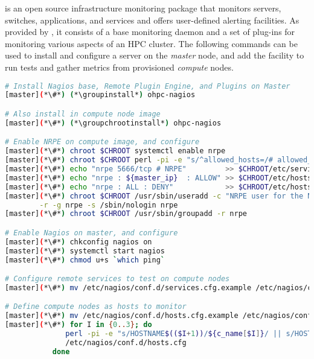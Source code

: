 \Nagios{} is an open source infrastructure monitoring package that monitors
servers, switches, applications, and services and offers user-defined alerting
facilities. As provided by \OHPC{}, it consists of a base monitoring daemon and
a set of plug-ins for monitoring various aspects of an HPC cluster.  The
following commands can be used to install and configure a \Nagios{} server on the {\em
master} node, and add the facility to run tests and gather metrics from
provisioned {\em compute} nodes.

\begin{lstlisting}[language=bash,keywords={},upquote=true]
# Install Nagios base, Remote Plugin Engine, and Plugins on Master
[master](*\#*) (*\groupinstall*) ohpc-nagios

# Also install in compute node image
[master](*\#*) (*\groupchrootinstall*) ohpc-nagios

# Enable NRPE on compute image, and configure
[master](*\#*) chroot $CHROOT systemctl enable nrpe
[master](*\#*) chroot $CHROOT perl -pi -e "s/^allowed_hosts=/# allowed_hosts=/" /etc/nagios/nrpe.cfg
[master](*\#*) echo "nrpe 5666/tcp # NRPE"         >> $CHROOT/etc/services
[master](*\#*) echo "nrpe : ${master_ip}  : ALLOW" >> $CHROOT/etc/hosts.allow
[master](*\#*) echo "nrpe : ALL : DENY"            >> $CHROOT/etc/hosts.allow
[master](*\#*) chroot $CHROOT /usr/sbin/useradd -c "NRPE user for the NRPE service" -d /var/run/nrpe \
        -r -g nrpe -s /sbin/nologin nrpe
[master](*\#*) chroot $CHROOT /usr/sbin/groupadd -r nrpe

# Enable Nagios on master, and configure
[master](*\#*) chkconfig nagios on
[master](*\#*) systemctl start nagios
[master](*\#*) chmod u+s `which ping`

# Configure remote services to test on compute nodes
[master](*\#*) mv /etc/nagios/conf.d/services.cfg.example /etc/nagios/conf.d/services.cfg

# Define compute nodes as hosts to monitor
[master](*\#*) mv /etc/nagios/conf.d/hosts.cfg.example /etc/nagios/conf.d/hosts.cfg
[master](*\#*) for I in {0..3}; do
              perl -pi -e "s/HOSTNAME$(($I+1))/${c_name[$I]}/ || s/HOST$(($I+1))_IP/${c_ip[$I]}/" \
              /etc/nagios/conf.d/hosts.cfg
           done
\end{lstlisting}

